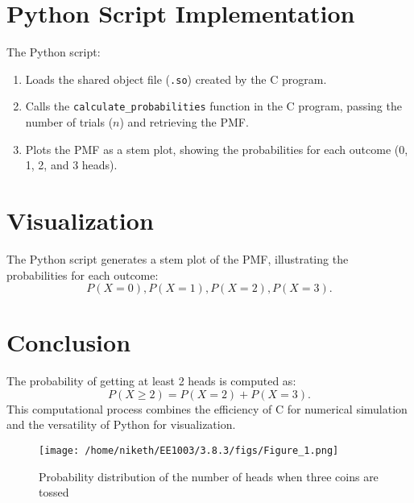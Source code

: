 \documentclass[journal]{IEEEtran}
\begin{document}
\section*{Python Script Implementation}
The Python script:
\begin{enumerate}
    \item Loads the shared object file (\texttt{.so}) created by the C program.
    \item Calls the \texttt{calculate\_probabilities} function in the C program, passing the number of trials (\( n \)) and retrieving the PMF.
    \item Plots the PMF as a stem plot, showing the probabilities for each outcome (0, 1, 2, and 3 heads).
\end{enumerate}

\section*{Visualization}
The Python script generates a stem plot of the PMF, illustrating the probabilities for each outcome:
\[
P(X = 0), P(X = 1), P(X = 2), P(X = 3).
\]

\section*{Conclusion}
The probability of getting at least 2 heads is computed as:
\[
P(X \geq 2) = P(X = 2) + P(X = 3).
\]
This computational process combines the efficiency of C for numerical simulation and the versatility of Python for visualization.

	\begin{figure}[h!]
		\centering
		\texttt{[image: /home/niketh/EE1003/3.8.3/figs/Figure\_1.png]}
		\caption{Probability distribution of the number of heads when three coins are tossed}
		\label{stemplot}
	\end{figure}
	
\end{document}
